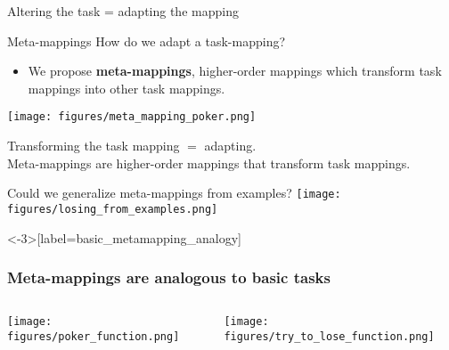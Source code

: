 \documentclass{beamer}
\begin{document}
\begin{frame}{Altering the task = adapting the mapping}
\end{frame}


\begin{frame}{Meta-mappings}
How do we adapt a task-mapping?
\begin{itemize}
\item We propose \textbf{meta-mappings}, higher-order mappings which transform task mappings into other task mappings.
\end{itemize}
\texttt{[image: figures/meta\_mapping\_poker.png]}
\end{frame}

\begin{frame}[standout]
Transforming the task mapping \(=\) adapting. \\[1em]
Meta-mappings are higher-order mappings that transform task mappings.
\end{frame}

\begin{frame}{Could we generalize meta-mappings from examples?}
\centering
\texttt{[image: figures/losing\_from\_examples.png]}
\end{frame}

\begin{frame}<-3>[label=basic_metamapping_analogy]
\frametitle{Meta-mappings are analogous to basic tasks}
\begin{columns}
\begin{column}{0.5\textwidth}
\vspace{2em}
\texttt{[image: figures/poker\_function.png]}
\end{column}
\begin{column}{0.5\textwidth}
\vspace{2em}
\texttt{[image: figures/try\_to\_lose\_function.png]}
\end{column}
\end{columns}
\end{frame}
\end{document}
